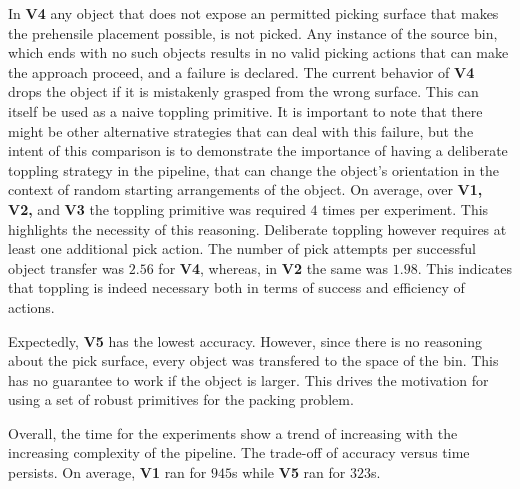 In \textbf{V4} any object that does not expose an permitted picking surface that makes the prehensile placement possible, is not picked. Any instance of the source bin, which ends with no such objects results in no valid picking actions that can make the approach proceed, and a failure is declared. The current behavior of \textbf{V4} drops the object if it is mistakenly grasped from the wrong surface. This can itself be used as a naive toppling primitive. It is important to note that there might be other alternative strategies that can deal with this failure, but the intent of this comparison is to demonstrate the importance of having a deliberate toppling strategy in the pipeline, that can change the object's orientation in the context of random starting arrangements of the object.  On average, over \textbf{V1, V2,} and \textbf{V3} the toppling primitive was required $4$ times per experiment. This highlights the necessity of this reasoning. Deliberate toppling however requires at least one additional pick action. The number of pick attempts per successful object transfer was $2.56$ for \textbf{V4}, whereas, in \textbf{V2} the same was $1.98$. This indicates that toppling is indeed necessary both in terms of success and efficiency of actions.  

Expectedly, \textbf{V5} has the lowest accuracy. However, since there is no reasoning about the pick surface, every object was transfered to the space of the bin. This has no guarantee to work if the object is larger. This drives the motivation for using a set of robust primitives for the packing problem.

Overall, the time for the experiments show a trend of increasing with the increasing complexity of the pipeline. The trade-off of accuracy versus time persists. On average, \textbf{V1} ran for $945$s while \textbf{V5} ran for $323$s.



